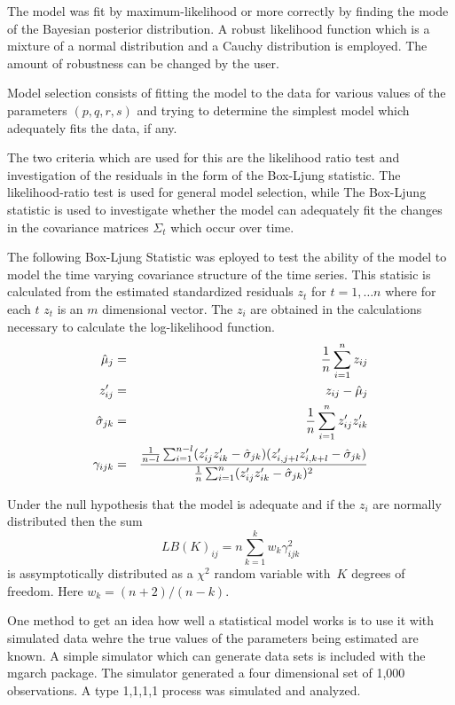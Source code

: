 The model was fit by maximum-likelihood or more correctly by
finding the mode of the Bayesian posterior distribution.
A robust likelihood function which is a mixture of a normal
distribution and a Cauchy distribution is employed.  The amount of robustness
can be changed by the user.



Model selection consists of fitting the model to the data for various values
of the parameters $(p,q,r,s)$ and trying to determine the simplest model
which adequately fits the data, if any. 

The two criteria which are used for this are the likelihood ratio test
and investigation of the residuals in the form of the Box-Ljung statistic.
The likelihood-ratio test is used for general model selection, while
The Box-Ljung statistic is used to investigate whether the model
can adequately fit the changes in the covariance matrices $\Sigma_t$
which occur over time.


The following Box-Ljung
Statistic was eployed 
to test the ability of the model to model the time varying covariance
structure of the time series. This statisic is calculated from the
estimated standardized residuals $z_t$ for $t=1,\ldots n$
where for each $t$ $z_t$ is an $m$ dimensional vector.
The $z_i$ are obtained in the calculations necessary to calculate the
log-likelihood function.
\begin{eqnarray}
  \hat\mu_j&=&{1\over n}\sum_{i=1}^n z_{ij}\cr
  z_{ij}^{\prime}&=&z_{ij}-\hat\mu_j\cr
  \hat\sigma_{jk}&=&{1\over n}\sum_{i=1}^n z_{ij}^\prime z_{ik}^\prime\cr
  \gamma_{ijk}&=&
       {
            {1\over n-l}\sum_{i=1}^{n-l}
         (z_{ij}^\prime z_{ik}^\prime-\hat\sigma_{jk})
         (z_{i,j+l}^\prime z_{i,k+l}^\prime-\hat\sigma_{jk})
            \over                              
            {1\over n}\sum_{i=1}^n
         (z_{ij}^\prime z_{ik}^\prime-\hat\sigma_{jk})^2
       }
\end{eqnarray}

Under the null hypothesis that the model is adequate and if the
$z_i$ are normally distributed then the sum
$$LB(K)_{ij}=n\sum_{k=1}^k w_k \gamma_{ijk}^2$$
is assymptotically distributed as a $\chi^2$ random variable 
with~$K$ degrees of freedom. Here $w_k=(n+2)/(n-k)$.


One method to get an idea how well a statistical model works is to
use it with simulated data wehre the true values of the parameters being estimated
are known.
A simple simulator which can generate data sets is included with the
mgarch package. The simulator generated a four dimensional set of
1,000 observations. A type 1,1,1,1 process was simulated and
analyzed.

